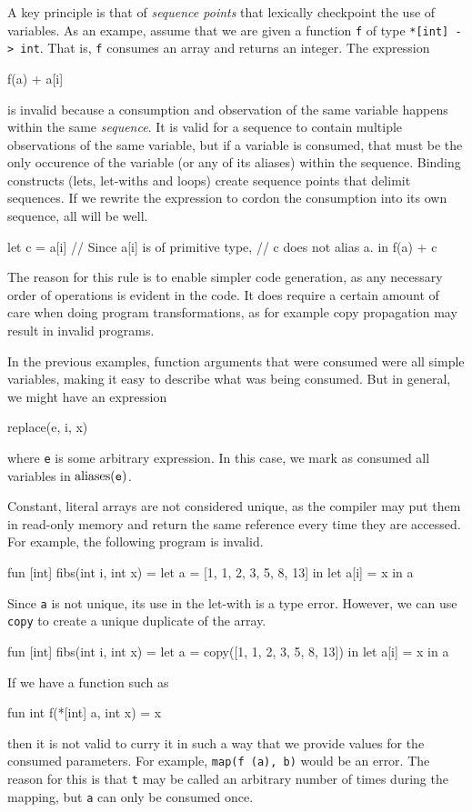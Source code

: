 A key principle is that of \textit{sequence points} that lexically
checkpoint the use of variables.  As an exampe, assume that we are
given a function \texttt{f} of type \texttt{*[int] -> int}.  That is,
\texttt{f} consumes an array and returns an integer.  The expression
\begin{colorcode}
  f(a) + a[i]
\end{colorcode}
is invalid because a consumption and observation of the same variable
happens within the same \textit{sequence}.  It is valid for a sequence
to contain multiple observations of the same variable, but if a
variable is consumed, that must be the only occurence of the variable
(or any of its aliases) within the sequence.  Binding constructs
(lets, let-withs and loops) create sequence points that delimit
sequences.  If we rewrite the expression to cordon the consumption
into its own sequence, all will be well.
\begin{colorcode}
  let c = a[i] // Since a[i] is of primitive type,
               // c does not alias a.
  in f(a) + c
\end{colorcode}

The reason for this rule is to enable simpler code generation, as any
necessary order of operations is evident in the code.  It does require
a certain amount of care when doing program transformations, as for
example copy propagation may result in invalid programs.

In the previous examples, function arguments that were consumed were
all simple variables, making it easy to describe what was being
consumed.  But in general, we might have an expression
\begin{colorcode}
  replace(e, i, x)
\end{colorcode}
where \texttt{e} is some arbitrary expression.  In this case, we mark
as consumed all variables in $\textrm{aliases}(\texttt{e})$.

Constant, literal arrays are not considered unique, as the compiler
may put them in read-only memory and return the same reference every
time they are accessed.  For example, the following program is
invalid.
\begin{colorcode}
  fun [int] fibs(int i, int x) =
    let a = [1, 1, 2, 3, 5, 8, 13] in
    let a[i] = x in a
\end{colorcode}
Since \texttt{a} is not unique, its use in the let-with is a type
error.  However, we can use \texttt{copy} to create a unique duplicate
of the array.
\begin{colorcode}
  fun [int] fibs(int i, int x) =
    let a = copy([1, 1, 2, 3, 5, 8, 13]) in
    let a[i] = x in a
\end{colorcode}

If we have a function such as
\begin{colorcode}
  fun int f(*[int] a, int x) = x
\end{colorcode}
then it is not valid to curry it in such a way that we provide values
for the consumed parameters.  For example, \texttt{map(f (a), b)}
would be an error.  The reason for this is that \texttt{t} may be
called an arbitrary number of times during the mapping, but \texttt{a}
can only be consumed once.

